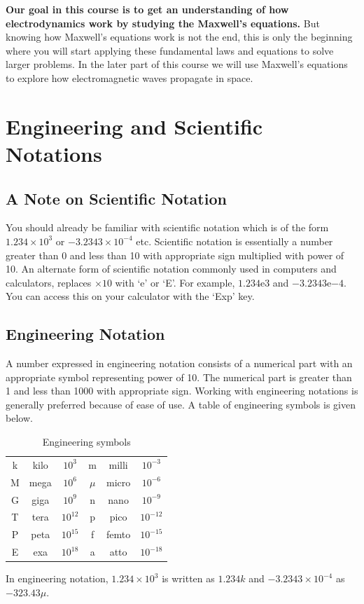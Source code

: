 \documentclass[12pt,a4paper]{article}
\begin{document}
\textbf{Our goal in this course is to get an understanding of how electrodynamics work by studying the Maxwell's equations.} But knowing how Maxwell's equations work is not the end, this is only the beginning where you will start applying these fundamental laws and equations to solve larger problems. In the later part of this course we will use Maxwell's equations to explore how electromagnetic waves propagate in space.

\section{Engineering and Scientific Notations}
\subsection{A Note on Scientific Notation}
You should already be familiar with scientific notation which is of the form $1.234\times10^3$ or $-3.2343\times 10^{-4}$ etc. Scientific notation is essentially a number greater than 0 and less than 10 with appropriate sign multiplied with power of 10. An alternate form of scientific notation commonly used in computers and calculators, replaces $\times 10$ with `e' or `E'. For example, $1.234\mathrm{e}3$ and $-3.2343\mathrm{e}$$-4$. You can access this on your calculator with the `Exp' key.
\subsection{Engineering Notation}
A number expressed in engineering notation consists of a numerical part with an appropriate symbol representing power of 10. The numerical part is greater than 1 and less than 1000 with appropriate sign. Working with engineering notations is generally preferred because of ease of use. A table of engineering symbols is given below.
\begin{table}[H]
\begin{center}
	\begin{tabular}{|c|c|c||c|c|c|}
	\hline \hline
		k\rule{0pt}{2.6ex} & kilo & $10^3$ & m & milli & $10^{-3}$\\
		M & mega & $10^6$ & $\mu$ & micro & $10^{-6}$\\
		G & giga & $10^9$ & n & nano & $10^{-9}$\\
		T & tera & $10^{12}$ & p & pico & $10^{-12}$\\
		P & peta & $10^{15}$ & f & femto & $10^{-15}$\\
		E & exa & $10^{18}$ & a & atto & $10^{-18}$\\
	\hline \hline
	\end{tabular}
\end{center}
\label{Engineering-symbols}
\caption{Engineering symbols}
\end{table}
\noindent In engineering notation, $1.234\times10^3$ is written as $1.234k$ and $-3.2343\times 10^{-4}$ as $-323.43\mu$.
\end{document}
